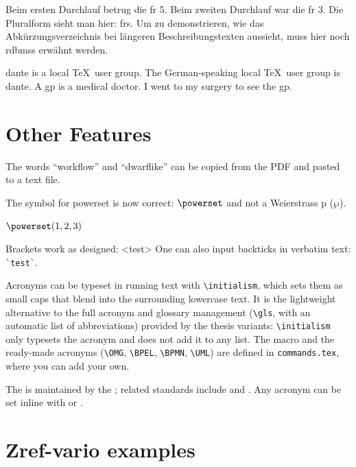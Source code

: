 \documentclass[../main-german]{subfiles}
\begin{document}
\begin{ltgexample}
Beim ersten Durchlauf betrug die \gls{fr} 5.
Beim zweiten Durchlauf war die \gls{fr} 3.
Die Pluralform sieht man hier: \glspl{fr}.
Um zu demonstrieren, wie das Abkürzungsverzeichnis bei längeren Beschreibungstexten aussieht, muss hier noch \glspl{rdbms} erwähnt werden.

\gls{dante} is a local \TeX\ user group.
The German-speaking local \TeX\ user group is \gls{dante}.
A \gls{gp} is a medical doctor.
I went to my surgery to see the \gls{gp}.
\end{ltgexample}

\section{Other Features}

\begin{ltgexample}
The words \enquote{workflow} and \enquote{dwarflike} can be copied from the PDF and pasted to a text file.
\end{ltgexample}

\begin{ltgexample}
The symbol for powerset is now correct: $\powerset$ and not a Weierstrass p ($\wp$).

$\powerset({1,2,3})$
\end{ltgexample}

\begin{ltgexample}
Brackets work as designed:
<test>
One can also input backticks in verbatim text: \verb|`test`|.
\end{ltgexample}

Acronyms can be typeset in running text with \verb+\initialism+, which sets them as small caps that blend into the surrounding lowercase text. It is the lightweight alternative to the full acronym and glossary management (\verb+\gls+, with an automatic list of abbreviations) provided by the thesis variants: \verb+\initialism+ only typesets the acronym and does not add it to any list. The macro and the ready-made acronyms (\verb+\OMG+, \verb+\BPEL+, \verb+\BPMN+, \verb+\UML+) are defined in \texttt{commands.tex}, where you can add your own.

\begin{ltgexample}
The \UML is maintained by the \OMG; related standards include \BPEL and \BPMN.
Any acronym can be set inline with  or .
\end{ltgexample}


\section{Zref-vario examples}
\label{sec:ex:vref}
\end{document}
